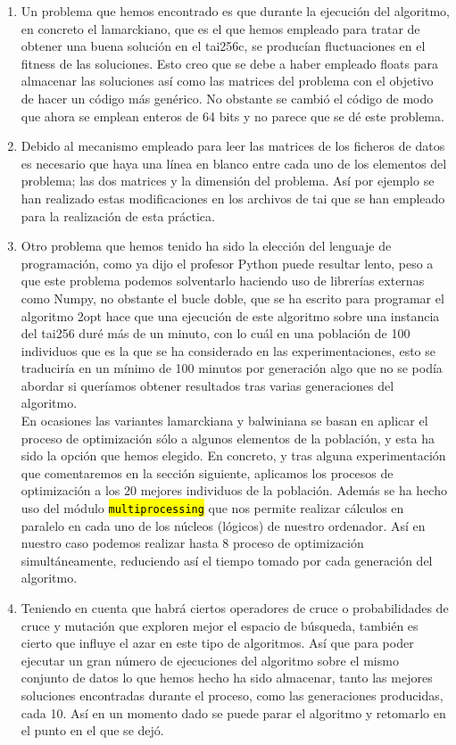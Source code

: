 \documentclass[10pt,a4paper]{article}
\newcommand{\code}[1]{\sethlcolor{light-gray}\hl{\texttt{#1}}} %
\begin{document}
\begin{enumerate}
\item Un problema que hemos encontrado es que durante la ejecución del algoritmo, en concreto el lamarckiano, que es el que hemos empleado para tratar de obtener una buena solución en el tai256c, se producían fluctuaciones en el fitness de las soluciones. Esto creo que se debe a haber empleado floats para almacenar las soluciones así como las matrices del problema con el objetivo de hacer un código más genérico. No obstante se cambió el código de modo que ahora se emplean enteros de 64 bits y no parece que se dé este problema.
\item Debido al mecanismo empleado para leer las matrices de los ficheros de datos es necesario que haya una línea en blanco entre cada uno de los elementos del problema; las dos matrices y la dimensión del problema. Así por ejemplo se han realizado estas modificaciones en los archivos de tai que se han empleado para la realización de esta práctica.
\item Otro problema que hemos tenido ha sido la elección del lenguaje de programación, como ya dijo el profesor Python puede resultar lento, peso a que este problema podemos solventarlo haciendo uso de librerías externas como Numpy, no obstante el bucle doble, que se ha escrito para programar el algoritmo 2opt hace que una ejecución de este algoritmo sobre una instancia del tai256 duré más de un minuto, con lo cuál en una población de 100 individuos que es la que se ha considerado en las experimentaciones, esto se traduciría en un mínimo de 100 minutos por generación algo que no se podía abordar si queríamos obtener resultados tras varias generaciones del algoritmo.\\

En ocasiones las variantes lamarckiana y balwiniana se basan en aplicar el proceso de optimización sólo a algunos elementos de la población, y esta ha sido la opción que hemos elegido. En concreto, y tras alguna experimentación que comentaremos en la sección siguiente, aplicamos los procesos de optimización a los 20 mejores individuos de la población. Además se ha hecho uso del módulo \code{multiprocessing} que nos permite realizar cálculos en paralelo en cada uno de los núcleos (lógicos) de nuestro ordenador. Así en nuestro caso podemos realizar hasta 8 proceso de optimización simultáneamente, reduciendo así el tiempo tomado por cada generación del algoritmo.

\item Teniendo en cuenta que habrá ciertos operadores de cruce o probabilidades de cruce y mutación que exploren mejor el espacio de búsqueda, también es cierto que influye el azar en este tipo de algoritmos. Así que para poder ejecutar un gran número de ejecuciones del algoritmo sobre el mismo conjunto de datos lo que hemos hecho ha sido almacenar, tanto las mejores soluciones encontradas durante el proceso, como las generaciones producidas, cada 10. Así en un momento dado se puede parar el algoritmo y retomarlo en el punto en el que se dejó.\\


\end{enumerate}
\end{document}

